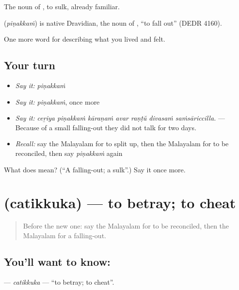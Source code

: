The noun of , to sulk, already familiar.

\begin{cousinweb}
\textbf{} (\emph{piṇakkaṁ}) is native Dravidian, the noun of , \textquotedblleft{}to fall out\textquotedblright{} (DEDR 4160).
\end{cousinweb}

\begin{grammarlens}[title={What you've built}]
One more word for describing what you lived and felt.
\end{grammarlens}

\subsection*{Your turn}
\begin{itemize}
\raggedright
  \item \emph{Say it:} \emph{piṇakkaṁ}
  \item \emph{Say it:} \emph{piṇakkaṁ}, once more
  \item \emph{Say it:} \emph{ceṟiya piṇakkaṁ kāraṇaṁ avar raṇṭŭ divasaṁ saṁsāriccilla.} — Because of a small falling-out they did not talk for two days.
  \item \emph{Recall:} say the Malayalam for to split up, then the Malayalam for to be reconciled, then say \emph{piṇakkaṁ} again
\end{itemize}

\begin{tcolorbox}[breakable,colback=teal!4,colframe=teal!35!black,title={Before you move on}]
What does  mean? (\textquotedblleft{}A falling-out; a sulk\textquotedblright{}.) Say it once more.
\end{tcolorbox}
\section[\texorpdfstring{\ml{ചതിക്കുക} (catikkuka)}{ചതിക്കുക (catikkuka)}]{ (catikkuka) — to betray; to cheat}

\label{lesson:ML-C556-catikkuka}



\begin{quote}
Before the new one: say the Malayalam for to be reconciled, then the Malayalam for a falling-out.
\end{quote}

\subsection*{You'll want to know: }
\textbf{} — \emph{catikkuka} — \textquotedblleft{}to betray; to cheat\textquotedblright{}.

